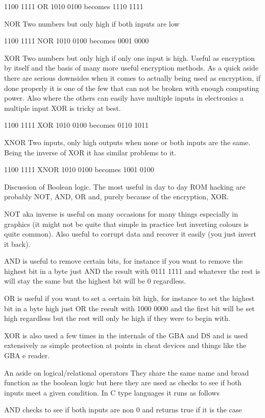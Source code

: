 \documentclass[
]{book}
\begin{document}
1100 1111 OR 1010 0100 becomes 1110 1111

NOR Two numbers but only high if both inputs are low

1100 1111 NOR 1010 0100 becomes 0001 0000

XOR Two numbers but only high if only one input is high. Useful as encryption by itself and the basis of many more useful encryption methods. As a quick aside there are serious downsides when it comes to actually being used as encryption, if done properly it is one of the few that can not be broken with enough computing power. Also where the others can easily have multiple inputs in electronics a multiple input XOR is tricky at best.

1100 1111 XOR 1010 0100 becomes 0110 1011

XNOR Two inputs, only high outputs when none or both inputs are the same. Being the inverse of XOR it has similar problems to it.

1100 1111 XNOR 1010 0100 becomes 1001 0100

Discussion of Boolean logic. The most useful in day to day ROM hacking are probably NOT, AND, OR and, purely because of the encryption, XOR.

NOT aka inverse is useful on many occasions for many things especially in graphics (it might not be quite that simple in practice but inverting colours is quite common). Also useful to corrupt data and recover it easily (you just invert it back).

AND is useful to remove certain bits, for instance if you want to remove the highest bit in a byte just AND the result with 0111 1111 and whatever the rest is will stay the same but the highest bit will be 0 regardless.

OR is useful if you want to set a certain bit high, for instance to set the highest bit in a byte high just OR the result with 1000 0000 and the first bit will be set high regardless but the rest will only be high if they were to begin with.

XOR is also used a few times in the internals of the GBA and DS and is used extensively as simple protection at points in cheat devices and things like the GBA e reader.

An aside on logical/relational operators They share the same name and broad function as the boolean logic but here they are used as checks to see if both inputs meet a given condition. In C type languages it runs as follows

AND checks to see if both inputs are non 0 and returns true if it is the case
\end{document}
